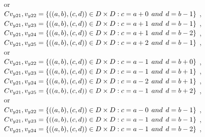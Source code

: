 \\or
\\$C{v_{y21},v_{y22}}=\{((a,b),(c,d))\in D\times D: c = a + 0\hspace{1ex} and \hspace{1ex}  d = b - 1 \}$ , 
\\$C{v_{y21},v_{y23}}=\{((a,b),(c,d))\in D\times D: c = a + 1\hspace{1ex} and \hspace{1ex}  d = b - 1 \}$ , 
\\$C{v_{y21},v_{y24}}=\{((a,b),(c,d))\in D\times D: c = a + 1\hspace{1ex} and \hspace{1ex}  d = b - 2 \}$ , 
\\$C{v_{y21},v_{y25}}=\{((a,b),(c,d))\in D\times D: c = a + 2\hspace{1ex} and \hspace{1ex}  d = b - 1 \}$ , 
\\or
\\$C{v_{y21},v_{y22}}=\{((a,b),(c,d))\in D\times D: c = a - 1\hspace{1ex} and \hspace{1ex}  d = b + 0 \}$ , 
\\$C{v_{y21},v_{y23}}=\{((a,b),(c,d))\in D\times D: c = a - 1\hspace{1ex} and \hspace{1ex}  d = b + 1 \}$ , 
\\$C{v_{y21},v_{y24}}=\{((a,b),(c,d))\in D\times D: c = a - 2\hspace{1ex} and \hspace{1ex}  d = b + 1 \}$ , 
\\$C{v_{y21},v_{y25}}=\{((a,b),(c,d))\in D\times D: c = a - 1\hspace{1ex} and \hspace{1ex}  d = b + 2 \}$ , 
\\or
\\$C{v_{y21},v_{y22}}=\{((a,b),(c,d))\in D\times D: c = a - 0\hspace{1ex} and \hspace{1ex}  d = b - 1 \}$ , 
\\$C{v_{y21},v_{y23}}=\{((a,b),(c,d))\in D\times D: c = a - 1\hspace{1ex} and \hspace{1ex}  d = b - 1 \}$ , 
\\$C{v_{y21},v_{y24}}=\{((a,b),(c,d))\in D\times D: c = a - 1\hspace{1ex} and \hspace{1ex}  d = b - 2 \}$ , 
